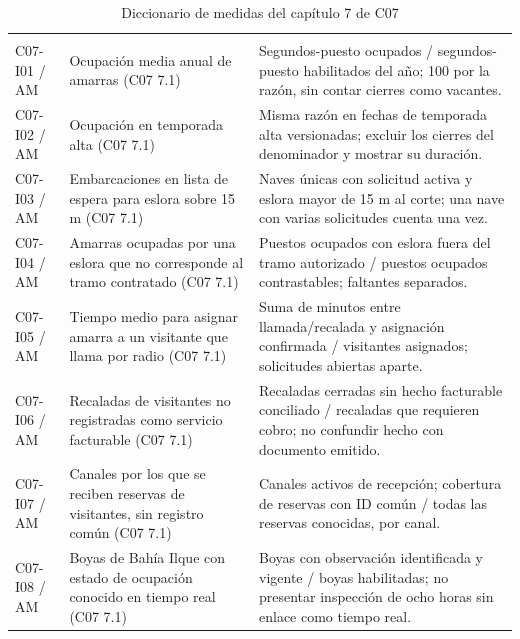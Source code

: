 \begin{longtable}{@{}L{.12\linewidth}L{.32\linewidth}L{\dimexpr.56\tabcolsep\relax}@{}}
\caption{Diccionario de medidas del capítulo 7 de C07}\label{tab:sem5_medidas}\\\hline
{} &  & \\\hline
\endfirsthead
\hline{} &  & \\\hline\endhead
C07-I01 / AM & Ocupación media anual de amarras (C07 7.1) & Segundos-puesto ocupados /\allowbreak{} segundos-puesto habilitados del año; 100 por la razón, sin contar cierres como vacantes. \\ \hline
C07-I02 / AM & Ocupación en temporada alta (C07 7.1) & Misma razón en fechas de temporada alta versionadas; excluir los cierres del denominador y mostrar su duración. \\ \hline
C07-I03 / AM & Embarcaciones en lista de espera para eslora sobre 15 m (C07 7.1) & Naves únicas con solicitud activa y eslora mayor de 15 m al corte; una nave con varias solicitudes cuenta una vez. \\ \hline
C07-I04 / AM & Amarras ocupadas por una eslora que no corresponde al tramo contratado (C07 7.1) & Puestos ocupados con eslora fuera del tramo autorizado /\allowbreak{} puestos ocupados contrastables; faltantes separados. \\ \hline
C07-I05 / AM & Tiempo medio para asignar amarra a un visitante que llama por radio (C07 7.1) & Suma de minutos entre llamada/\allowbreak{}recalada y asignación confirmada /\allowbreak{} visitantes asignados; solicitudes abiertas aparte. \\ \hline
C07-I06 / AM & Recaladas de visitantes no registradas como servicio facturable (C07 7.1) & Recaladas cerradas sin hecho facturable conciliado /\allowbreak{} recaladas que requieren cobro; no confundir hecho con documento emitido. \\ \hline
C07-I07 / AM & Canales por los que se reciben reservas de visitantes, sin registro común (C07 7.1) & Canales activos de recepción; cobertura de reservas con ID común /\allowbreak{} todas las reservas conocidas, por canal. \\ \hline
C07-I08 / AM & Boyas de Bahía Ilque con estado de ocupación conocido en tiempo real (C07 7.1) & Boyas con observación identificada y vigente /\allowbreak{} boyas habilitadas; no presentar inspección de ocho horas sin enlace como tiempo real. \\ \hline

\end{longtable}
